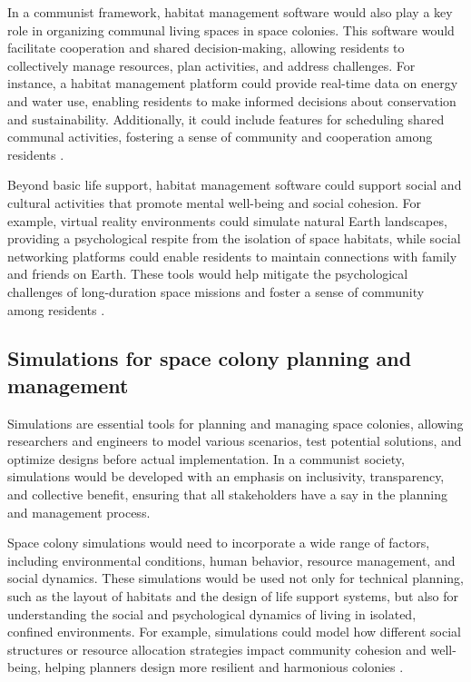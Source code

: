 In a communist framework, habitat management software would also play a key role in organizing communal living spaces in space colonies. This software would facilitate cooperation and shared decision-making, allowing residents to collectively manage resources, plan activities, and address challenges. For instance, a habitat management platform could provide real-time data on energy and water use, enabling residents to make informed decisions about conservation and sustainability. Additionally, it could include features for scheduling shared communal activities, fostering a sense of community and cooperation among residents \cite[pp.~275-278]{korolev2022}.

Beyond basic life support, habitat management software could support social and cultural activities that promote mental well-being and social cohesion. For example, virtual reality environments could simulate natural Earth landscapes, providing a psychological respite from the isolation of space habitats, while social networking platforms could enable residents to maintain connections with family and friends on Earth. These tools would help mitigate the psychological challenges of long-duration space missions and foster a sense of community among residents \cite[pp.~67-69]{debord1967}.

\subsection{Simulations for space colony planning and management}

Simulations are essential tools for planning and managing space colonies, allowing researchers and engineers to model various scenarios, test potential solutions, and optimize designs before actual implementation. In a communist society, simulations would be developed with an emphasis on inclusivity, transparency, and collective benefit, ensuring that all stakeholders have a say in the planning and management process.

Space colony simulations would need to incorporate a wide range of factors, including environmental conditions, human behavior, resource management, and social dynamics. These simulations would be used not only for technical planning, such as the layout of habitats and the design of life support systems, but also for understanding the social and psychological dynamics of living in isolated, confined environments. For example, simulations could model how different social structures or resource allocation strategies impact community cohesion and well-being, helping planners design more resilient and harmonious colonies \cite[pp.~300-302]{smith2024}.

